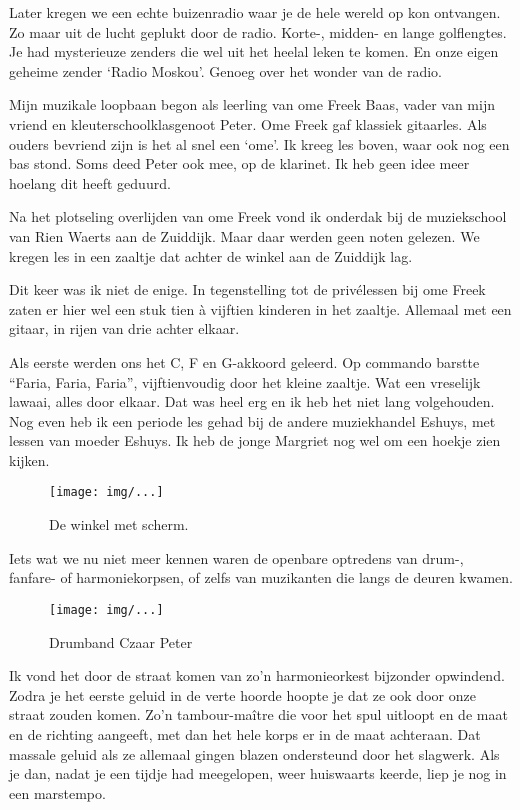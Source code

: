 \documentclass[10pt,twoside,openright]{memoir}
\begin{document}
Later kregen we een echte buizenradio waar je de hele wereld op kon ontvangen. Zo maar uit de lucht geplukt door de radio. Korte-, midden- en lange golflengtes. Je had mysterieuze zenders die wel uit het heelal leken te komen. En onze eigen geheime zender `Radio Moskou’. Genoeg over het wonder van de radio.

Mijn muzikale loopbaan begon als leerling van ome Freek Baas, vader van mijn vriend en kleuterschoolklasgenoot Peter. Ome Freek gaf klassiek gitaarles. Als ouders bevriend zijn is het al snel een `ome'. Ik kreeg les boven, waar ook nog een bas stond. Soms deed Peter ook mee, op de klarinet. Ik heb geen idee meer hoelang dit heeft geduurd. 

Na het plotseling overlijden van ome Freek vond ik onderdak bij de muziekschool van Rien Waerts aan de Zuiddijk. Maar daar werden geen noten gelezen. We kregen les in een zaaltje dat achter de winkel aan de Zuiddijk lag. 

Dit keer was ik niet de enige. In tegenstelling tot de privélessen bij ome Freek zaten er hier wel een stuk tien à vijftien kinderen in het zaaltje. Allemaal met een gitaar, in rijen van drie achter elkaar. 

Als eerste werden ons het C, F en G-akkoord geleerd. Op commando barstte “Faria, Faria, Faria”, vijftienvoudig door het kleine zaaltje. Wat een vreselijk lawaai, alles door elkaar. Dat was heel erg en ik heb het niet lang volgehouden. Nog even heb ik een periode les gehad bij de andere muziekhandel Eshuys, met lessen van moeder Eshuys. Ik heb de jonge Margriet nog wel om een hoekje zien kijken. 

\begin{figure}[t]
\texttt{[image: img/...]}
\caption{De winkel met scherm.}
\end{figure}

Iets wat we nu niet meer kennen waren de openbare optredens van drum-, fanfare- of harmoniekorpsen, of zelfs van muzikanten die langs de deuren kwamen. 

\begin{figure}[t]
\texttt{[image: img/...]}
\caption{Drumband Czaar Peter}
\end{figure}

Ik vond het door de straat komen van zo’n harmonieorkest bijzonder opwindend. Zodra je het eerste geluid in de verte hoorde hoopte je dat ze ook door onze straat zouden komen. Zo’n tambour-maître die voor het spul uitloopt en de maat en de richting aangeeft, met dan het hele korps er in de maat achteraan. Dat massale geluid als ze allemaal gingen blazen ondersteund door het slagwerk. Als je dan, nadat je een tijdje had meegelopen, weer huiswaarts keerde, liep je nog in een marstempo.
\end{document}
